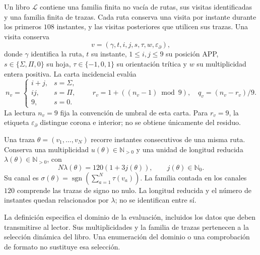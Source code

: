 \begin{definition}
\label{vi:vi:dep:libro-dominio}
Un libro \(\mathscr L\) contiene una familia finita no vacía de rutas,
sus visitas identificadas y una familia finita de trazas. Cada ruta
conserva una visita por instante durante los primeros \(108\) instantes,
y las visitas posteriores que utilicen sus trazas. Una visita conserva
\[
 v=(\gamma,t,i,j,s,\tau,w,\varepsilon_\partial),
\]
donde \(\gamma\) identifica la ruta, \(t\) su instante, \(1\le i,j\le9\)
su posición APP, \(s\in\{\Sigma,\Pi,0\}\) su hoja,
\(\tau\in\{-1,0,1\}\) su orientación trítica y \(w\) su multiplicidad
entera positiva. La carta incidencial evalúa
\[
 n_v=
 \begin{cases}
 i+j,&s=\Sigma,\\
 ij,&s=\Pi,\\
 9,&s=0.
 \end{cases}
 \qquad
 r_v=1+((n_v-1)\bmod9),\quad q_v=(n_v-r_v)/9.
\]
La lectura \(n_v=9\) fija la convención de umbral de esta carta.
Para \(r_v=9\), la etiqueta \(\varepsilon_\partial\) distingue
corona e interior; no se obtiene únicamente del residuo.

Una traza \(\theta=(v_1,\ldots,v_N)\) recorre instantes consecutivos de
una misma ruta. Conserva una multiplicidad \(u(\theta)\in\mathbb N_{>0}\)
y una unidad de longitud reducida
\(\lambda(\theta)\in\mathbb N_{>0}\), con
\[
 N\lambda(\theta)=120(1+3j(\theta)),\qquad j(\theta)\in\mathbb N_0.
\]
Su canal es
\(\sigma(\theta)=\operatorname{sgn}(\sum_{a=1}^N\tau(v_a))\).
La familia contada en los canales \(120\) comprende las trazas de
signo no nulo. La longitud reducida y el número de instantes quedan
relacionados por \(\lambda\); no se identifican entre sí.
\end{definition}

La definición especifica el dominio de la evaluación, incluidos los
datos que deben transmitirse al lector. Sus multiplicidades y la familia
de trazas pertenecen a la selección dinámica del libro. Una enumeración
del dominio o una comprobación de formato no sustituye esa selección.


